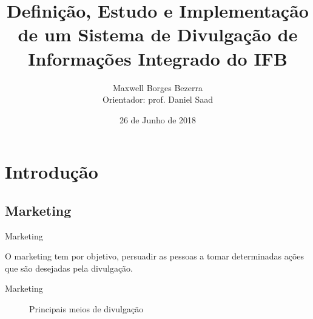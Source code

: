 \documentclass{aula-ifb}
\author{Maxwell Borges Bezerra\\ 
\small{Orientador: prof. Daniel Saad}}
\title{Definição, Estudo e Implementação de um Sistema de Divulgação de Informações Integrado do IFB}
\institute{Instituto Federal de Brasília, Câmpus Taguatinga}
\date{26 de Junho de 2018}
\begin{document}
\maketitle
\section{Introdução}
\subsection{Marketing}
\begin{frame}{Marketing}
\begin{center}
O marketing tem por objetivo, persuadir as pessoas a tomar determinadas ações que são desejadas pela divulgação.
\end{center}
\end{frame}

\begin{frame}{Marketing}
	\begin{figure}[h]
  		\centering
  \quad %
  \quad %
  \quad %
   \caption{Principais meios de divulgação}
	\label{fig1}
\end{figure}
\end{frame}
\end{document}
